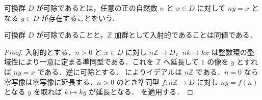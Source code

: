 \begin{defn}[可除可換群]
可換群 $D$ が可除であるとは，任意の正の自然数 $n$ と $x\in D$ に対して $ny=x$ となる $y\in D$ が存在することをいう．
\end{defn}
\begin{prop}[可除性と整数加群の入射性]
可換群 $D$ が可除であることと，$\mathbb Z$ 加群として入射的であることは同値である．
\end{prop}
\begin{proof}
入射的とする．$n>0$ と $x\in D$ に対し $n\mathbb Z\to D$，$nk\mapsto kx$ は整数環の整域性により一意に定まる準同型である．これを $\mathbb Z$ へ延長して $1$ の像を $y$ とすれば $ny=x$ である．逆に可除とする． によりイデアルは $n\mathbb Z$ である．$n=0$ なら零写像は零写像に延長する．$n>0$ のとき準同型 $f:n\mathbb Z\to D$ に対し $ny=f(n)$ となる $y$ を取れば $k\mapsto ky$ が延長となる． を適用する．
\end{proof}
